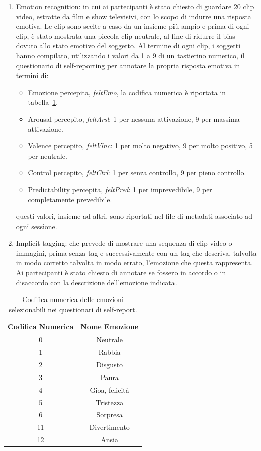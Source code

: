 \begin{enumerate}
    \item Emotion recognition: in cui ai partecipanti è stato chiesto di guardare 20 clip video, estratte da film e show televisivi, con lo scopo di indurre una risposta emotiva. Le clip sono scelte a caso da un insieme più ampio e prima di ogni clip, è stato mostrata una piccola clip neutrale, al fine di ridurre il bias dovuto allo stato emotivo del soggetto.
    Al termine di ogni clip, i soggetti hanno compilato, utilizzando i valori da 1 a 9 di un tastierino numerico, il questionario di self-reporting per annotare la propria risposta emotiva in termini di:
    \begin{itemize}
        \item Emozione percepita, \emph{feltEmo}, la codifica numerica è riportata in tabella~\ref{tab:emotions_map}.
        \item Arousal percepito, \emph{feltArsl}: 1 per nessuna attivazione, 9 per massima attivazione.
        \item Valence percepito, \emph{feltVlnc}: 1 per molto negativo, 9 per molto positivo, 5 per neutrale.
        \item Control percepito, \emph{feltCtrl}: 1 per senza controllo, 9 per pieno controllo.
        \item Predictability percepita, \emph{feltPred}: 1 per imprevedibile, 9 per completamente prevedibile.
    \end{itemize}
    questi valori, insieme ad altri, sono riportati nel file di metadati associato ad ogni sessione.

    \item Implicit tagging: che prevede di mostrare una sequenza di clip video o immagini, prima senza tag e successivamente con un tag che descriva, talvolta in modo corretto talvolta in modo errato, l'emozione che questa rappresenta. Ai partecipanti è stato chiesto di annotare se fossero in accordo o in disaccordo con la descrizione dell'emozione indicata.
\end{enumerate}

\begin{table}[]
\centering
\begin{tabular}{c|c}
\toprule
Codifica Numerica & Nome Emozione \\
\midrule
0                 & Neutrale \\
1                 & Rabbia \\
2                 & Disgusto \\
3                 & Paura \\
4                 & Gioa, felicità \\
5                 & Tristezza \\
6                 & Sorpresa \\
11                & Divertimento \\
12                & Ansia \\
\bottomrule
\end{tabular}
\caption{Codifica numerica delle emozioni selezionabili nei questionari di self-report.}
\label{tab:emotions_map}
\end{table}

